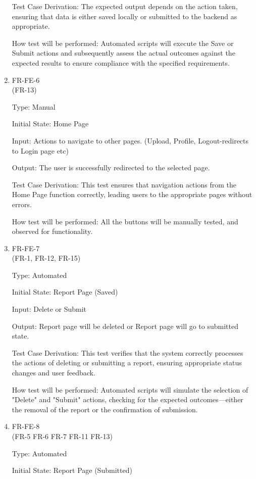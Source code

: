 \documentclass[12pt, titlepage]{article}
\begin{document}
\begin{enumerate}
Test Case Derivation: The expected output depends on the action taken, ensuring that data is either saved locally or submitted to the backend as appropriate.

How test will be performed: Automated scripts will execute the Save or Submit actions and subsequently assess the actual outcomes against the expected results to ensure compliance with the specified requirements.


\item{FR-FE-6\\} (FR-13)

Type: Manual
					
Initial State: Home Page 
					
Input: Actions to navigate to other pages. (Upload, Profile, Logout-redirects to Login page etc)
					
Output: The user is successfully redirected to the selected page.

Test Case Derivation: This test ensures that navigation actions from the Home Page function correctly, leading users to the appropriate pages without errors.

How test will be performed: All the buttons will be manually tested, and observed for functionality.

\item{FR-FE-7\\} (FR-1, FR-12, FR-15)

Type: Automated
					
Initial State: Report Page (Saved)
					
Input: Delete or Submit
					
Output: Report page will be deleted or Report page will go to submitted state.

Test Case Derivation: This test verifies that the system correctly processes the actions of deleting or submitting a report, ensuring appropriate status changes and user feedback.

How test will be performed: Automated scripts will simulate the selection of "Delete" and "Submit" actions, checking for the expected outcomes—either the removal of the report or the confirmation of submission.

\item{FR-FE-8\\} (FR-5 FR-6 FR-7 FR-11 FR-13)

Type: Automated
					
Initial State: Report Page (Submitted)
					

\end{enumerate}
\end{document}
